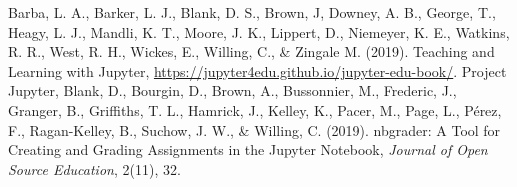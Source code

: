 \documentclass[twocolumn]{svjour3}          %
\begin{document}

\begin{thebibliography}{99}
%
%
Barba, L. A., Barker, L. J., Blank, D. S., Brown, J, Downey, A. B., George, T.,
Heagy, L. J., Mandli, K. T., Moore, J. K., Lippert, D., Niemeyer, K. E.,
Watkins, R. R., West, R. H., Wickes, E., Willing, C., \& Zingale M. (2019).
Teaching and Learning with Jupyter,
\url{https://jupyter4edu.github.io/jupyter-edu-book/}.
Project Jupyter, Blank, D., Bourgin, D., Brown, A., Bussonnier, M.,
Frederic, J., Granger, B., Griffiths, T. L.,  Hamrick, J., Kelley, K.,
Pacer, M., Page, L., P{\'e}rez, F., Ragan-Kelley, B., Suchow, J. W.,
\& Willing, C. (2019).
nbgrader: A Tool for Creating and Grading Assignments in the Jupyter Notebook,
\textit{Journal of Open Source Education}, 2(11), 32.
\end{thebibliography}
\end{document}
